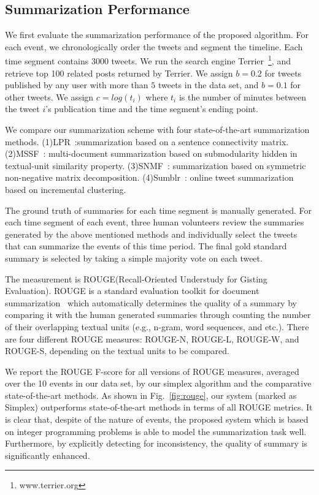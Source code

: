 \documentclass[envcountsame]{llncs}
\begin{document}
\subsection{Summarization Performance}
We first evaluate the summarization performance of the proposed algorithm. For each event, we chronologically order the tweets and segment the timeline. Each time segment contains 3000 tweets. We run the search engine Terrier~\footnote{www.terrier.org}, and  retrieve top 100 related posts returned by Terrier. We assign $b=0.2$ for tweets published by any user with more than $5$ tweets in the data set, and $b=0.1$ for other tweets. We assign $c=log(t_i)$ where $t_i$ is the number of minutes between the tweet $i$'s publication time and the time segment's ending point.

We compare our summarization scheme with  four state-of-the-art summarization methods. (1)LPR~\cite{LPR}:summarization based on a sentence connectivity matrix. (2)MSSF~\cite{MSSF}:  multi-document summarization based on submodularity hidden in textual-unit similarity property. (3)SNMF~\cite{SNMF}: summarization based on  symmetric non-negative matrix decomposition. (4)Sumblr~\cite{Shou2013Sumblr}: online tweet summarization based on incremental clustering.

The ground truth of summaries for each time segment is manually generated. For each time segment of each event, three human volunteers review the summaries generated by the above mentioned methods and individually select the tweets that can summarize the events of this time period. The final gold standard summary is selected by taking a simple majority vote on each tweet.

The measurement is ROUGE(Recall-Oriented Understudy for Gisting Evaluation). ROUGE is a standard evaluation toolkit for document summarization~\cite{ROUGE} which automatically determines the quality of a summary by comparing it with the human generated summaries through counting the number of their overlapping textual units (e.g., n-gram, word sequences, and etc.). There are four different ROUGE measures: ROUGE-N, ROUGE-L, ROUGE-W, and ROUGE-S, depending on the textual units to be compared.

We report the  ROUGE F-score for all versions of ROUGE measures, averaged over the 10 events in our data set, by our simplex algorithm and the comparative state-of-the-art methods. As shown in Fig.~\ref{fig:rouge}, our system (marked as Simplex) outperforms state-of-the-art methods in terms of all ROUGE metrics. It is clear that, despite of the nature of events, the proposed system which is based on integer programming problems is able to model the summarization task well. Furthermore, by explicitly detecting for inconsistency, the quality of summary is significantly enhanced.
\end{document}
